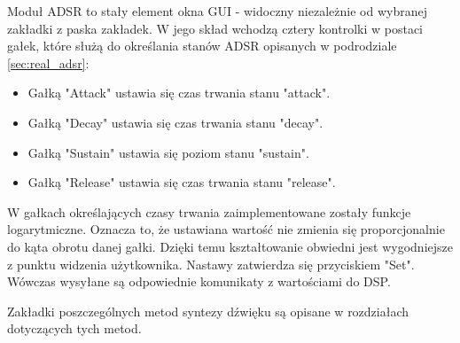 Moduł ADSR to stały element okna GUI - widoczny niezależnie od wybranej zakładki z paska zakładek. W jego skład wchodzą cztery kontrolki w postaci gałek, które służą do określania stanów ADSR opisanych w podrodziale \ref{sec:real_adsr}:
\begin{itemize}
	\item Gałką "Attack" ustawia się czas trwania stanu "attack".
	\item Gałką "Decay" ustawia się czas trwania stanu "decay".
	\item Gałką "Sustain" ustawia się poziom stanu "sustain".
	\item Gałką "Release" ustawia się czas trwania stanu "release".
\end{itemize}
W gałkach określających czasy trwania zaimplementowane zostały funkcje logarytmiczne. Oznacza to, że ustawiana wartość nie zmienia się proporcjonalnie do kąta obrotu danej gałki. Dzięki temu kształtowanie obwiedni jest wygodniejsze z punktu widzenia użytkownika. Nastawy zatwierdza się przyciskiem "Set". Wówczas wysyłane są odpowiednie komunikaty z wartościami do DSP.

Zakładki poszczególnych metod syntezy dźwięku są opisane w rozdziałach dotyczących tych metod.